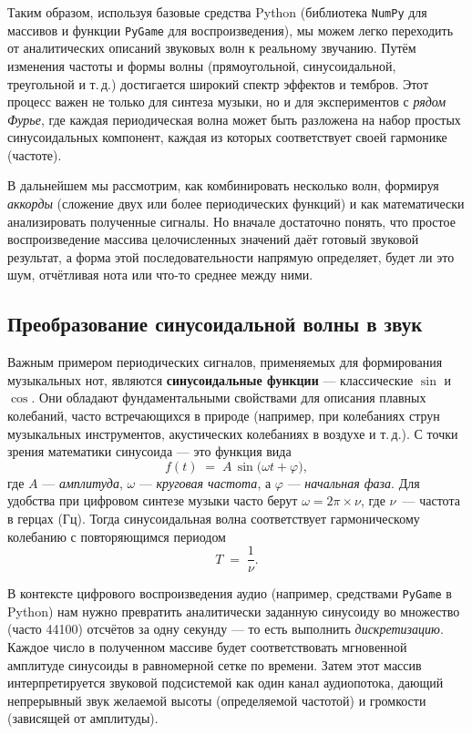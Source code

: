 \documentclass[bachelor, och, diploma]{SCWorks}
\begin{document}
Таким образом, используя базовые средства Python (библиотека \texttt{NumPy} для массивов и функции \texttt{PyGame} для воспроизведения), мы можем легко переходить от аналитических описаний звуковых волн к реальному звучанию. Путём изменения частоты и формы волны (прямоугольной, синусоидальной, треугольной и т.\,д.) достигается широкий спектр эффектов и тембров. Этот процесс важен не только для синтеза музыки, но и для экспериментов с \textit{рядом Фурье}, где каждая периодическая волна может быть разложена на набор простых синусоидальных компонент, каждая из которых соответствует своей гармонике (частоте).

В дальнейшем мы рассмотрим, как комбинировать несколько волн, формируя \textit{аккорды} (сложение двух или более периодических функций) и как математически анализировать полученные сигналы. Но вначале достаточно понять, что простое воспроизведение массива целочисленных значений даёт готовый звуковой результат, а форма этой последовательности напрямую определяет, будет ли это шум, отчётливая нота или что-то среднее между ними.

\subsection{Преобразование синусоидальной волны в звук}

Важным примером периодических сигналов, применяемых для формирования музыкальных нот, являются \textbf{синусоидальные функции} — классические \(\sin\) и \(\cos\). Они обладают фундаментальными свойствами для описания плавных колебаний, часто встречающихся в природе (например, при колебаниях струн музыкальных инструментов, акустических колебаниях в воздухе и т.\,д.). С точки зрения математики синусоида — это функция вида
\[
   f(t) \;=\; A \,\sin\bigl(\omega t + \varphi\bigr),
\]
где \(A\) — \textit{амплитуда}, \(\omega\) — \textit{круговая частота}, а \(\varphi\) — \textit{начальная фаза}. Для удобства при цифровом синтезе музыки часто берут \(\omega = 2\pi \times \nu\), где \(\nu\)~— частота в герцах (Гц). Тогда синусоидальная волна соответствует гармоническому колебанию с повторяющимся периодом
\[
   T \;=\; \frac{1}{\nu}.
\]

В контексте цифрового воспроизведения аудио (например, средствами \texttt{PyGame} в Python) нам нужно превратить аналитически заданную синусоиду во множество (часто 44100) отсчётов за одну секунду — то есть выполнить \textit{дискретизацию}. Каждое число в полученном массиве будет соответствовать мгновенной амплитуде синусоиды в равномерной сетке по времени. Затем этот массив интерпретируется звуковой подсистемой как один канал аудиопотока, дающий непрерывный звук желаемой высоты (определяемой частотой) и громкости (зависящей от амплитуды).
\end{document}

